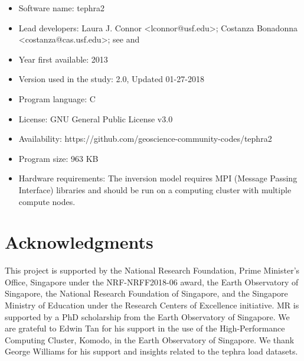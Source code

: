 \noindent
\begin{itemize}
    \item Software name: tephra2
    \item Lead developers: Laura J. Connor <lconnor@usf.edu>; Costanza Bonadonna <costanza@cas.usf.edu>; see \cite{bonadonna2005probabilistic} and \cite{connor2006inversion}
    \item Year first available: 2013
    \item Version used in the study: 2.0, Updated 01-27-2018
    \item Program language: C
    \item License: GNU General Public License v3.0
    \item Availability: https://github.com/geoscience-community-codes/tephra2
    \item Program size: 963 KB
    \item Hardware requirements: The inversion model requires MPI (Message Passing Interface) libraries and should be run on a computing cluster with multiple compute nodes. 
\end{itemize}

\section{Acknowledgments}
This project is supported by the National Research Foundation, Prime Minister’s Office, Singapore under the NRF-NRFF2018-06 award, the Earth Observatory of Singapore, the National Research Foundation of Singapore, and the Singapore Ministry of Education under the Research Centers of Excellence initiative. MR is supported by a PhD scholarship from the Earth Observatory of Singapore. We are grateful to Edwin Tan for his support in the use of the High-Performance Computing Cluster, Komodo, in the Earth Observatory of Singapore. We thank George Williams for his support and insights related to the tephra load datasets.
